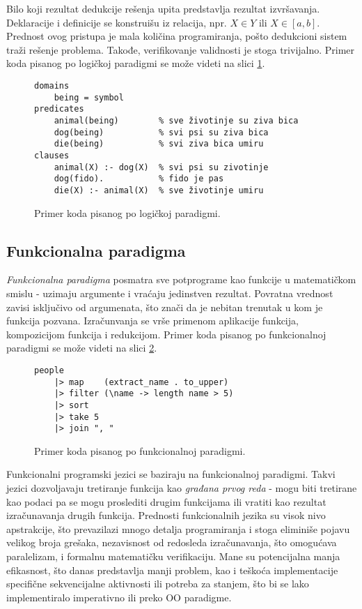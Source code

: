 Bilo koji rezultat dedukcije rešenja upita predstavlja rezultat izvršavanja. Deklaracije i definicije se konstruišu iz relacija, npr. $X \in Y$ ili $X \in [a,b]$. Prednost ovog pristupa je mala količina programiranja, pošto dedukcioni sistem traži rešenje problema. Takođe, verifikovanje validnosti je stoga trivijalno. Primer koda pisanog po logičkoj paradigmi se može videti na slici \ref{fig:ParadigmLogical}.

\begin{figure}[h!]
\begin{lstlisting}
domains
    being = symbol 
predicates
    animal(being)        % sve životinje su ziva bica
    dog(being)           % svi psi su ziva bica
    die(being)           % svi ziva bica umiru 
clauses
    animal(X) :- dog(X)  % svi psi su zivotinje
    dog(fido).           % fido je pas
    die(X) :- animal(X)  % sve životinje umiru 
\end{lstlisting}
\caption{Primer koda pisanog po logičkoj paradigmi.}
\label{fig:ParadigmLogical}
\end{figure}


\subsection{Funkcionalna paradigma}
\label{subsec:ParadigmFunctional}

\emph{Funkcionalna paradigma} posmatra sve potprograme kao funkcije u matematičkom smislu - uzimaju argumente i vraćaju jedinstven rezultat. Povratna vrednost zavisi isključivo od argumenata, što znači da je nebitan trenutak u kom je funkcija pozvana. Izračunvanja se vrše primenom aplikacije funkcija, kompozicijom funkcija i redukcijom. Primer koda pisanog po funkcionalnoj paradigmi se može videti na slici \ref{fig:ParadigmFunctional}.

\begin{figure}[h!]
\begin{lstlisting}
people 
    |> map    (extract_name . to_upper) 
    |> filter (\name -> length name > 5) 
    |> sort
    |> take 5
    |> join ", "
\end{lstlisting}
\caption{Primer koda pisanog po funkcionalnoj paradigmi.}
\label{fig:ParadigmFunctional}
\end{figure}
    
Funkcionalni programski jezici se baziraju na funkcionalnoj paradigmi. Takvi jezici dozvoljavaju tretiranje funkcija kao \emph{građana prvog reda} - mogu biti tretirane kao podaci pa se mogu proslediti drugim funkcijama ili vratiti kao rezultat izračunavanja drugih funkcija. Prednosti funkcionalnih jezika su visok nivo apstrakcije, što prevazilazi mnogo detalja programiranja i stoga eliminiše pojavu velikog broja grešaka, nezavisnost od redosleda izračunavanja, što omogućava paralelizam, i formalnu matematičku verifikaciju. Mane su potencijalna manja efikasnost, što danas predstavlja manji problem, kao i teškoća implementacije specifične sekvencijalne aktivnosti ili potreba za stanjem, što bi se lako implementiralo imperativno ili preko OO paradigme.


